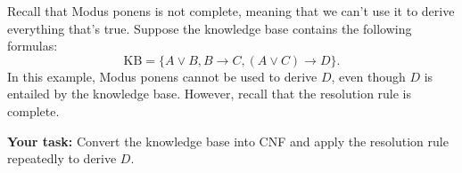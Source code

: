 \item {}
Recall that Modus ponens is not complete, meaning that we can't use it to derive
everything that's true. Suppose the knowledge base contains the following
formulas:
\[\text{KB} = \{ A \vee B, B \to C, (A \vee C) \to D \}.\]
In this example, Modus ponens cannot be used to derive $D$, even though $D$ is
entailed by the knowledge base. However, recall that the resolution rule is
complete.

{\bf Your task:} Convert the knowledge base into CNF and apply the resolution rule repeatedly
to derive $D$.
